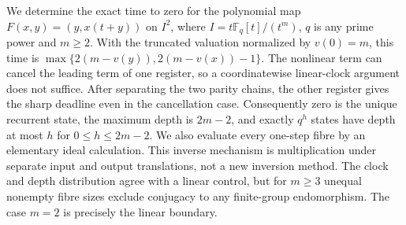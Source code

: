 We determine the exact time to zero for the polynomial map\linebreak
$F(x,y)=(y,x(t+y))$ on $I^2$, where
$I=t\mathbb F_q[t]/(t^m)$, $q$ is any prime power and $m\geq2$.
With the truncated valuation normalized by $v(0)=m$, this time is
$\max\{2(m-v(y)),2(m-v(x))-1\}$.
The nonlinear term can cancel the leading term of one register, so a
coordinatewise linear-clock argument does not suffice. After separating the
two parity chains, the other register gives the sharp deadline even in the
cancellation case. Consequently zero is the unique recurrent state, the
maximum depth is $2m-2$, and exactly $q^h$ states have depth at most $h$
for $0\leq h\leq2m-2$.
We also evaluate every one-step fibre by an elementary ideal calculation.
This inverse mechanism is multiplication under separate input and output
translations, not a new inversion method. The clock and depth distribution
agree with a linear control, but for $m\geq3$ unequal nonempty fibre sizes
exclude conjugacy to any finite-group endomorphism. The case $m=2$ is
precisely the linear boundary.
